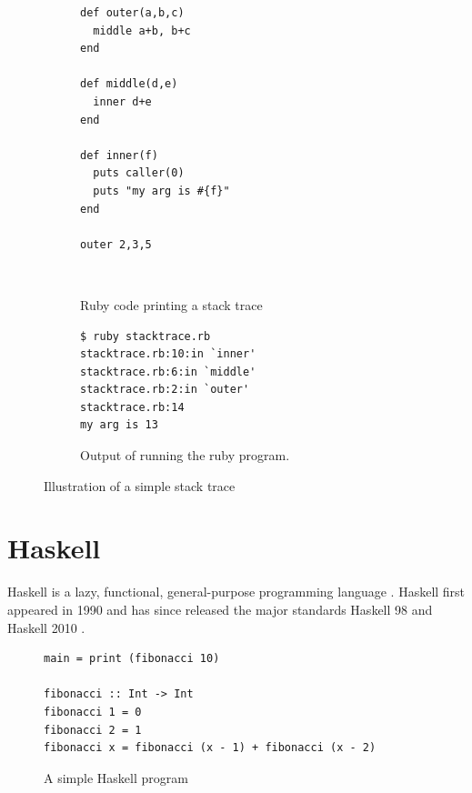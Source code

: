 \begin{figure}
\begin{mdframed}
  \begin{subfigure}[t]{0.5\textwidth}
      \begin{verbatim}
def outer(a,b,c)
  middle a+b, b+c
end

def middle(d,e)
  inner d+e
end

def inner(f)
  puts caller(0)
  puts "my arg is #{f}"
end

outer 2,3,5
       \end{verbatim}
    \caption{Ruby code printing a stack trace}
    ~ %
  \end{subfigure}
        \begin{subfigure}[t]{0.5\textwidth}
          \begin{verbatim}
$ ruby stacktrace.rb
stacktrace.rb:10:in `inner'
stacktrace.rb:6:in `middle'
stacktrace.rb:2:in `outer'
stacktrace.rb:14
my arg is 13
          \end{verbatim}
          \caption{Output of running the ruby program.}
        \end{subfigure}
        \caption{Illustration of a simple stack trace
        }\label{fig:ruby_stack_trace}
\end{mdframed}
\end{figure}

\section{Haskell}

Haskell is a lazy, functional, general-purpose programming language \cite{haskell_report2010}.
Haskell first appeared in 1990 \cite{HistoryOfHaskell2007} and has since
released the major standards Haskell 98 and Haskell 2010
\cite{haskell_report2010}.

\begin{figure}
\begin{mdframed}
  \begin{verbatim}
main = print (fibonacci 10)

fibonacci :: Int -> Int
fibonacci 1 = 0
fibonacci 2 = 1
fibonacci x = fibonacci (x - 1) + fibonacci (x - 2)
  \end{verbatim}
  \caption{A simple Haskell program}
  \label{fig:simple_program}
\end{mdframed}
\end{figure}

